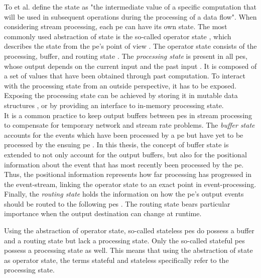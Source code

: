 To et al. \cite{To.2017} define the state as "the intermediate value of a specific computation that will be used in subsequent operations during the processing of a data flow".  When considering stream processing, each \gls{pe} can have its own state. The most commonly used abstraction of state is the so-called operator state \cite{To.2017}, which describes the state from the \gls{pe}'s point of view \cite{To.2017}. The operator state consists of the processing, buffer, and routing state \cite{To.2017}.
The \textit{processing state} is present in all \gls{pe}s, whose output depends on the current input and the past input \cite{CastroFernandez.2013}. It is composed of a set of values that have been obtained through past computation. To interact with the processing state from an outside perspective, it has to be exposed. Exposing the processing state can be achieved by storing it in mutable data structures \cite{CastroFernandez.2016}, or by providing an interface to in-memory processing state.\\
It is a common practice to keep output buffers between \gls{pe}s in stream processing to compensate for temporary network and stream rate problems\cite{CastroFernandez.2013}. The \textit{buffer state} accounts for the events which have been processed by a \gls{pe} but have yet to be processed by the ensuing \gls{pe} \cite{CastroFernandez.2013}. In this thesis, the concept of buffer state is extended to not only account for the output buffers, but also for the positional information about the event that has most recently been processed by the \gls{pe}. Thus, the positional information represents how far processing has progressed in the event-stream, linking the operator state to an exact point in event-processing.\\
Finally, the \textit{routing state} holds the information on how the \gls{pe}'s output events should be routed to the following \gls{pe}s \cite{CastroFernandez.2013}. The routing state bears particular importance when the output destination can change at runtime.\par
Using the abstraction of operator state, so-called stateless \gls{pe}s do possess a buffer and a routing state but lack a processing state. Only the so-called stateful \gls{pe}s possess a processing state as well. This means that using the abstraction of state as operator state, the terms stateful and stateless specifically refer to the processing state.\par

